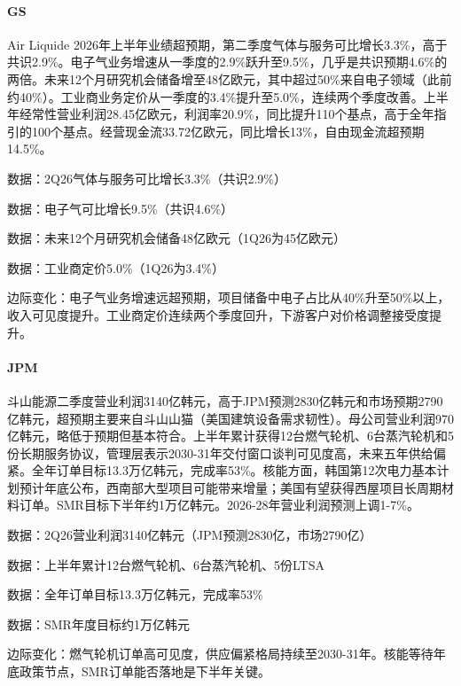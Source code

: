 \documentclass[11pt]{ctexart}
\begin{document}
\paragraph{GS} Air Liquide 2026年上半年业绩超预期，第二季度气体与服务可比增长3.3\%，高于共识2.9\%。电子气业务增速从一季度的2.9\%跃升至9.5\%，几乎是共识预期4.6\%的两倍。未来12个月研究机会储备增至48亿欧元，其中超过50\%来自电子领域（此前约40\%）。工业商业务定价从一季度的3.4\%提升至5.0\%，连续两个季度改善。上半年经常性营业利润28.45亿欧元，利润率20.9\%，同比提升110个基点，高于全年指引的100个基点。经营现金流33.72亿欧元，同比增长13\%，自由现金流超预期14.5\%。
{\small\color{refgray}数据：2Q26气体与服务可比增长3.3\%（共识2.9\%）\par}
{\small\color{refgray}数据：电子气可比增长9.5\%（共识4.6\%）\par}
{\small\color{refgray}数据：未来12个月研究机会储备48亿欧元（1Q26为45亿欧元）\par}
{\small\color{refgray}数据：工业商定价5.0\%（1Q26为3.4\%）\par}
{\small\color{refgray}边际变化：电子气业务增速远超预期，项目储备中电子占比从40\%升至50\%以上，收入可见度提升。工业商定价连续两个季度回升，下游客户对价格调整接受度提升。\par}
\paragraph{JPM} 斗山能源二季度营业利润3140亿韩元，高于JPM预测2830亿韩元和市场预期2790亿韩元，超预期主要来自斗山山猫（美国建筑设备需求韧性）。母公司营业利润970亿韩元，略低于预期但基本符合。上半年累计获得12台燃气轮机、6台蒸汽轮机和5份长期服务协议，管理层表示2030-31年交付窗口谈判可见度高，未来五年供给偏紧。全年订单目标13.3万亿韩元，完成率53\%。核能方面，韩国第12次电力基本计划预计年底公布，西南部大型项目可能带来增量；美国有望获得西屋项目长周期材料订单。SMR目标下半年约1万亿韩元。2026-28年营业利润预测上调1-7\%。
{\small\color{refgray}数据：2Q26营业利润3140亿韩元（JPM预测2830亿，市场2790亿）\par}
{\small\color{refgray}数据：上半年累计12台燃气轮机、6台蒸汽轮机、5份LTSA\par}
{\small\color{refgray}数据：全年订单目标13.3万亿韩元，完成率53\%\par}
{\small\color{refgray}数据：SMR年度目标约1万亿韩元\par}
{\small\color{refgray}边际变化：燃气轮机订单高可见度，供应偏紧格局持续至2030-31年。核能等待年底政策节点，SMR订单能否落地是下半年关键。\par}
\end{document}
